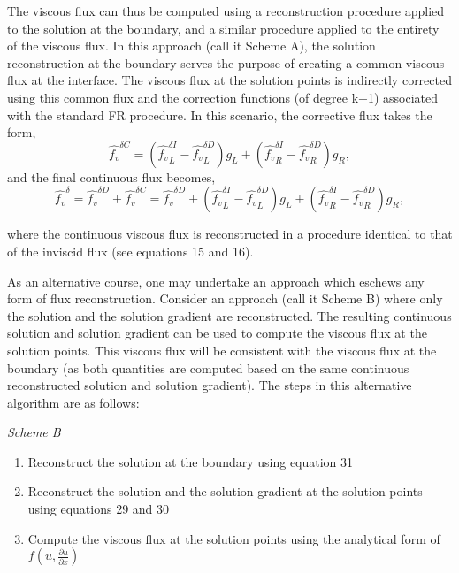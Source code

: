 \vspace{0.1 in}

\noindent The viscous flux can thus be computed using a reconstruction procedure applied to the solution at the boundary, and a similar procedure applied to the entirety of the viscous flux. In this approach (call it Scheme A), the solution reconstruction at the boundary serves the purpose of creating a common viscous flux at the interface. The viscous flux at the solution points is indirectly corrected using this common flux and the correction functions (of degree k+1) associated with the standard FR procedure. In this scenario, the corrective flux takes the form,
\begin{equation}
\hat{f_v}^{\delta C}=(\hat{f_v}^{\delta I}_L-\hat{f_v}^{\delta D}_L)g_L+(\hat{f_v}^{\delta I}_R-\hat{f_v}^{\delta D}_R)g_R,
\end{equation}
and the final continuous flux becomes,
\begin{equation}
\hat{f_v}^{\delta}=\hat{f_v}^{\delta D}+\hat{f_v}^{\delta C}=\hat{f_v}^{\delta D}+(\hat{f_v}^{\delta I}_L-\hat{f_v}^{\delta D}_L)g_L+(\hat{f_v}^{\delta I}_R-\hat{f_v}^{\delta D}_R)g_R,
\end{equation}

\noindent where the continuous viscous flux is reconstructed in a procedure identical to that of the inviscid flux (see equations 15 and 16).

\vspace{0.1 in}

\noindent As an alternative course, one may undertake an approach which eschews any form of flux reconstruction. Consider an approach (call it Scheme B) where only the solution and the solution gradient are reconstructed. The resulting continuous solution and solution gradient can be used to compute the viscous flux at the solution points. This viscous flux will be consistent with the viscous flux at the boundary (as both quantities are computed based on the same continuous reconstructed solution and solution gradient). The steps in this alternative algorithm are as follows: 

\vspace{0.1 in}
\noindent \emph{Scheme B}	
\vspace{0.1 in}
\begin{enumerate}
\item Reconstruct the solution at the boundary using equation 31
\item Reconstruct the solution and the solution gradient at the solution points using equations 29 and 30
\item Compute the viscous flux at the solution points using the analytical form of $f(u, \frac {\partial u}{\partial x})$
\end{enumerate}

